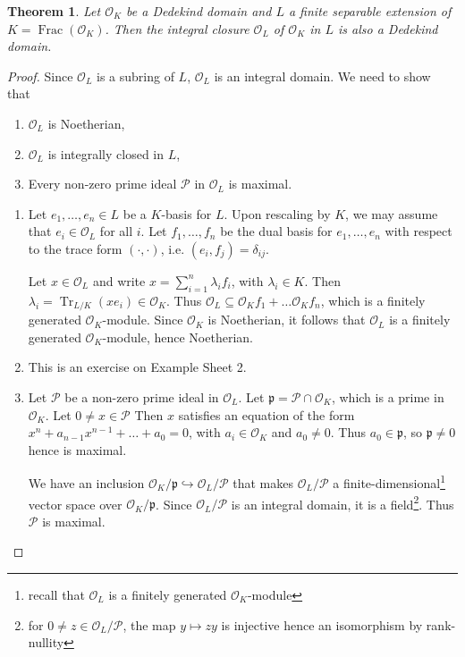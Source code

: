 \documentclass[11pt]{article}
\theoremstyle{definition}
\theoremstyle{plain}
\newtheorem{theorem}[definition]{Theorem}
\theoremstyle{remark}
\DeclareMathOperator{\Frac}{Frac}
\DeclareMathOperator{\Tr}{Tr}
\newcommand{\cO}{\mathcal{O}}
\newcommand{\cP}{\mathcal{P}}
\newcommand{\fp}{\mathfrak{p}}
\begin{document}
\begin{theorem}\label{thm:10_2}
    Let $\cO_K$ be a Dedekind domain and $L$ a finite separable extension of $K = \Frac(\cO_K)$. Then the integral closure $\cO_L$ of $\cO_K$ in $L$ is also a Dedekind domain.
\end{theorem}
\begin{proof}
    Since $\cO_L$ is a subring of $L$, $\cO_L$ is an integral domain. We need to show that
    \begin{enumerate}
        \item $\cO_L$ is Noetherian,
        \item $\cO_L$ is integrally closed in $L$,
        \item Every non-zero prime ideal $\cP$ in $\cO_L$ is maximal.
    \end{enumerate}

    \begin{enumerate}
        \item Let $e_1, \ldots, e_n \in L$ be a $K$-basis for $L$. Upon rescaling by $K$, we may assume that $e_i \in \cO_L$ for all $i$. Let $f_1, \ldots, f_n$ be the dual basis for $e_1, \ldots, e_n$ with respect to the trace form $(\cdot, \cdot)$, i.e. $(e_i, f_j) = \delta_{ij}$.

            Let $x \in \cO_L$ and write $x = \sum_{i=1}^n \lambda_i f_i$, with $\lambda_i \in K$. Then $\lambda_i = \Tr_{L/K}(x e_i) \in \cO_K$. Thus $\cO_L \subseteq \cO_K f_1 + \ldots \cO_K f_n$, which is a finitely generated $\cO_K$-module. Since $\cO_K$ is Noetherian, it follows that $\cO_L$ is a finitely generated $\cO_K$-module, hence Noetherian.

        \item This is an exercise on Example Sheet 2.

        \item Let $\cP$ be a non-zero prime ideal in $\cO_L$. Let $\fp = \cP \cap \cO_K$, which is a prime in $\cO_K$. Let $0 \neq x \in \cP$ Then $x$ satisfies an equation of the form $x^n + a_{n-1}x^{n-1} + \ldots + a_0 = 0$, with $a_i \in \cO_K$ and $a_0 \neq 0$. Thus $a_0 \in \fp$, so $\fp \neq 0$ hence is maximal.

            We have an inclusion $\cO_K / \fp \hookrightarrow \cO_L / \cP$ that makes $\cO_L / \cP$ a finite-dimensional\footnote{recall that $\cO_L$ is a finitely generated $\cO_K$-module} vector space over $\cO_K / \fp$. Since $\cO_L / \cP$ is an integral domain, it is a field\footnote{for $0 \neq z \in \cO_L / \cP$, the map $y \mapsto z y$ is injective hence an isomorphism by rank-nullity}. Thus $\cP$ is maximal. \qedhere
    \end{enumerate}
\end{proof}
\end{document}
